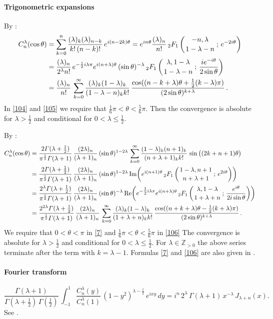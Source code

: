 \documentclass[envcountchap,graybox]{svmono}
\newcommand{\hyp}[5]{\mbox{}_{#1}{F}_{#2}
\left(\genfrac{}{}{0pt}{}{#3}{#4}\,;\,#5\right)}
\renewcommand{\Gamma}{\varGamma}
\newcommand\ZZ{\mathbb{Z}}
\newcommand\tha\theta
\newcommand\la\lambda
\newcommand\Ga{\Gamma}
\newcommand\half{\frac12}
\newcommand\thalf{\tfrac12}
\newcommand\iy\infty
\newcommand\Zpos{\ZZ_{>0}}
\renewcommand\Re{{\rm Re}\,}
\renewcommand\Im{{\rm Im}\,}
\begin{document}
\paragraph{Trigonometric expansions}
By :
\begin{align}
C_n^{\la}(\cos\tha)
&=\sum_{k=0}^n\frac{(\la)_k(\la)_{n-k}}{k!\,(n-k)!}\,e^{i(n-2k)\tha}
=e^{in\tha}\frac{(\la)_n}{n!}\,
\hyp21{-n,\la}{1-\la-n}{e^{-2i\tha}}\label{103}\\
&=\frac{(\la)_n}{2^\la n!}\,
e^{-\half i\la\pi}e^{i(n+\la)\tha}\,(\sin\tha)^{-\la}\,
\hyp21{\la,1-\la}{1-\la-n}{\frac{i e^{-i\tha}}{2\sin\tha}}\label{104}\\
&=\frac{(\la)_n}{n!}\,\sum_{k=0}^\iy\frac{(\la)_k(1-\la)_k}{(1-\la-n)_k k!}\,
\frac{\cos((n-k+\la)\tha+\thalf(k-\la)\pi)}{(2\sin\tha)^{k+\la}}\,.\label{105}
\end{align}
In \eqref{104} and \eqref{105} we require that
$\tfrac16\pi<\tha<\tfrac56\pi$. Then the convergence is absolute for $\la>\thalf$
and conditional for $0<\la\le\thalf$.

By \mycite{DLMF}{(14.13.1), (14.3.21), (15.8.1)]}:
\begin{align}
C_n^\la(\cos\tha)&=\frac{2\Ga(\la+\thalf)}{\pi^\half\Ga(\la+1)}\,
\frac{(2\la)_n}{(\la+1)_n}\,(\sin\tha)^{1-2\la}\,
\sum_{k=0}^\iy\frac{(1-\la)_k(n+1)_k}{(n+\la+1)_k k!}\,
\sin\big((2k+n+1)\tha\big)
\label{7}\\
&=\frac{2\Ga(\la+\thalf)}{\pi^\half\Ga(\la+1)}\,
\frac{(2\la)_n}{(\la+1)_n}\,(\sin\tha)^{1-2\la}\,
\Im\!\!\left(e^{i(n+1)\tha}\,\hyp21{1-\la,n+1}{n+\la+1}{e^{2i\tha}}\right)\nonumber\\
&=\frac{2^\la\Ga(\la+\thalf)}{\pi^\half\Ga(\la+1)}\,
\frac{(2\la)_n}{(\la+1)_n}\,(\sin\tha)^{-\la}\,
\Re\!\!\left(e^{-\thalf i\la\pi}e^{i(n+\la)\tha}\,
\hyp21{\la,1-\la}{1+\la+n}{\frac{e^{i\tha}}{2i\sin\tha}}\right)\nonumber\\
&=\frac{2^{2\la}\Ga(\la+\thalf)}{\pi^\half\Ga(\la+1)}\,\frac{(2\la)_n}{(\la+1)_n}\,
\sum_{k=0}^\iy\frac{(\la)_k(1-\la)_k}{(1+\la+n)_k k!}\,
\frac{\cos((n+k+\la)\tha-\thalf(k+\la)\pi)}{(2\sin\tha)^{k+\la}}\,.
\label{106}
\end{align}
We require that $0<\tha<\pi$ in \eqref{7} and $\tfrac16\pi<\tha<\tfrac56\pi$ in
\eqref{106} The convergence is absolute for $\la>\thalf$ and conditional for
$0<\la\le\thalf$.
For $\la\in\Zpos$ the above series terminate after the term with
$k=\la-1$.
Formulas \eqref{7} and \eqref{106} are also given in
.
%
\paragraph{Fourier transform}
\begin{equation}
\frac{\Ga(\la+1)}{\Ga(\la+\thalf)\,\Ga(\thalf)}\,
\int_{-1}^1 \frac{C_n^\la(y)}{C_n^\la(1)}\,(1-y^2)^{\la-\half}\,
e^{ixy}\,dy
=i^n\,2^\la\,\Ga(\la+1)\,x^{-\la}\,J_{\la+n}(x).
\label{8}
\end{equation}
See .
%
\end{document}
